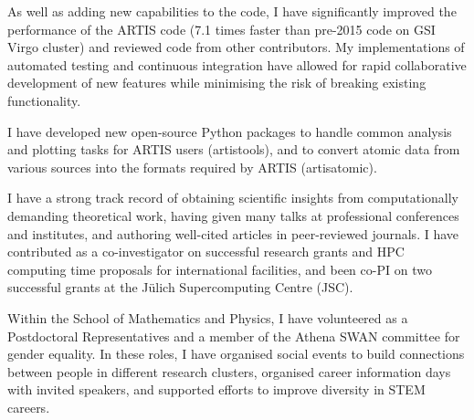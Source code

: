 \documentclass[11pt]{article} %
\begin{document}
As well as adding new capabilities to the code, I have significantly improved the performance of the ARTIS code (7.1 times faster than pre-2015 code on GSI Virgo cluster) and reviewed code from other contributors. My implementations of automated testing and continuous integration have allowed for rapid collaborative development of new features while minimising the risk of breaking existing functionality.

I have developed new open-source Python packages to handle common analysis and plotting tasks for ARTIS users (artistools), and to convert atomic data from various sources into the formats required by ARTIS (artisatomic).

I have a strong track record of obtaining scientific insights from computationally demanding theoretical work, having given many talks at professional conferences and institutes, and authoring well-cited articles in peer-reviewed journals. I have contributed as a co-investigator on successful research grants and HPC computing time proposals for international facilities, and been co-PI on two successful grants at the Jülich Supercomputing Centre (JSC).

Within the School of Mathematics and Physics, I have volunteered as a Postdoctoral Representatives and a member of the Athena SWAN committee for gender equality. In these roles, I have organised social events to build connections between people in different research clusters, organised career information days with invited speakers, and supported efforts to improve diversity in STEM careers.


%
\end{document}
